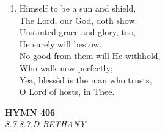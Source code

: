\begin{enumerate}
    \item Himself to be a sun and shield, \\
        The Lord, our God, doth show. \\
        Unstinted grace and glory, too, \\
        He surely will bestow. \\
        No good from them will He withhold, \\
        Who walk now perfectly; \\
        Yea, bless\`ed is the man who trusts, \\
        O Lord of hosts, in Thee.

\end{enumerate}

\newpage
\begin{center}
    {\Large \textbf{HYMN 406}}
    \\
    \textit{8.7.8.7.D BETHANY}
\end{center}
\vspace{1em}


